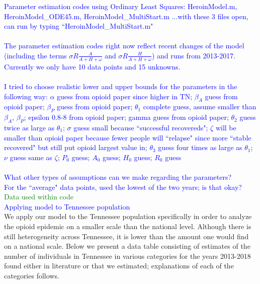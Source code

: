 \documentclass[12pt]{article}
\begin{document}
\textcolor{blue}{Parameter estimation codes using Ordinary Least Squares: HeroinModel.m, \linebreak HeroinModel\_ODE45.m, HeroinModel\_MultiStart.m ...with these 3 files open, can run by typing ``HeroinModel\_MultiStart.m" \\ \\
The parameter estimation codes right now reflect recent changes of the model (including the terms $\sigma R \frac{A}{A+H+\omega}$ and $\sigma R \frac{H}{A+H+\omega}$) and runs from 2013-2017. Currently we only have 10 data points and 15 unknowns. \\ \\
I tried to choose realistic lower and upper bounds for the parameters in the following way: $\alpha$ guess from opioid paper since higher in TN; $\beta_A $ guess from opioid paper; 
 $\beta_P$ guess from opioid paper; $\theta_1$ complete guess, assume smaller than $\beta_A$, $\beta_P$; 
 epsilon 0.8-8 from opioid paper; gamma guess from opioid paper; $\theta_2$
 guess twice as large as $\theta_1$; $\sigma$ guess small because
 ``successful recovereds"; $\zeta$ will be smaller than opioid paper because fewer people will ``relapse" since more ``stable recovered" but still
 put opioid largest value in; $\theta_3$ guess four times as large as
 $\theta_1$; $\nu$ guess same as $\zeta$; $P_0$
 guess; $A_0$ guess; $H_0$ guess; $R_0$ guess} \\ \\


\textcolor{blue}{What other types of assumptions can we make regarding the parameters?} \\
\textcolor{blue}{For the ``average" data points, used the lowest of the two years; is that okay?} \\
 
 \textcolor{green}{Data used within code} \\
 \textcolor{blue}{Applying model to Tennessee population} \\
We apply our model to the Tennessee population specifically in order to analyze the opioid epidemic on a smaller scale than the national level. Although there is still heterogeneity across Tennessee, it is lower than the amount one would find on a national scale. Below we present a data table consisting of estimates of the number of individuals in Tennessee in various categories for the years 2013-2018 found either in literature or that we estimated; explanations of each of the categories follows. 
\end{document}
